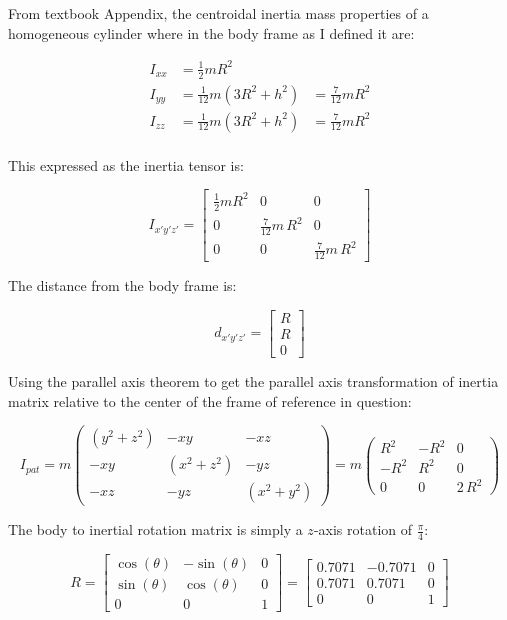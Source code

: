 \documentclass[12pt, letterpaper]{../assignment}
\begin{document}
From textbook Appendix,
the centroidal inertia mass properties of a homogeneous cylinder where in the body frame as I defined it are:

\begin{equation*}
    \begin{aligned}
        I_{xx} &= \frac{1}{2} m R^2 & \\
        I_{yy} &= \frac{1}{12} m \left(3 R^2+h^2\right) &= \frac{7}{12} m R^2\\
        I_{zz} &= \frac{1}{12} m \left(3 R^2+h^2\right) &= \frac{7}{12} m R^2\\
    \end{aligned}
\end{equation*}

This expressed as the inertia tensor is:

$$ I_{x'y'z'} = \left[\begin{array}{ccc} \frac{1}{2} m R^2 & 0 & 0\\
    0 & \frac{7}{12} m\,R^2 & 0\\ 0 & 0 & \frac{7}{12}m\,R^2 \end{array}\right] $$

The distance from the body frame is:

$$ d_{x'y'z'} = \left[\begin{array}{c} R\\ R\\ 0 \end{array}\right] $$

Using the parallel axis theorem to get the parallel axis transformation of inertia matrix
relative to the center of the frame of reference in question:

$$ I_{pat} = 
m\left(\begin{array}{ccc} \left(y^2 + z^2\right) & -xy & -xz\\
    -xy & \left(x^2 + z^2\right) & -yz\\
       -xz & -yz & \left(x^2 + y^2\right) \end{array}\right)
= m\left(\begin{array}{ccc} R^2 & -R^2 & 0\\ -R^2 & R^2 & 0\\ 0 & 0 & 2\,R^2 \end{array}\right)$$

The body to inertial rotation matrix is simply a $z$-axis rotation of $\frac{\pi}{4}$:

$$ R = \left[\begin{array}{ccc} \cos\left(\theta \right) & -\sin\left(\theta \right) & 0\\ \sin\left(\theta \right) & \cos\left(\theta \right) & 0\\ 0 & 0 & 1 \end{array}\right]
= \left[\begin{array}{ccc} 0.7071 & -0.7071 & 0\\ 0.7071 & 0.7071 & 0\\ 0 & 0 & 1 \end{array}\right]$$
\end{document}
